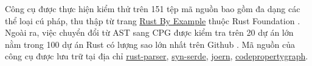 Công cụ được thực hiện kiểm thử trên 151 tệp mã nguồn bao gồm đa dạng các thể loại cú pháp, thu thập từ trang \href{https://doc.rust-lang.org/stable/rust-by-example/index.html}{Rust By Example} thuộc Rust Foundation \cite{rustlangRustFoundation}.
Ngoài ra, việc chuyển đổi từ AST sang CPG được kiểm tra trên 20 dự án lớn nằm trong 100 dự án Rust có lượng sao lớn nhất trên Github \cite {githubGithubRankingTop100RustmdMaster}.
Mã nguồn của công cụ được lưu trữ tại địa chỉ \href{https://github.com/congnghiahieu/rust-parser}{rust-parser}, \href{https://github.com/congnghiahieu/syn-serde}{syn-serde}, \href{https://github.com/congnghiahieu/joern}{joern}, \href{https://github.com/congnghiahieu/codepropertygraph}{codepropertygraph}.
